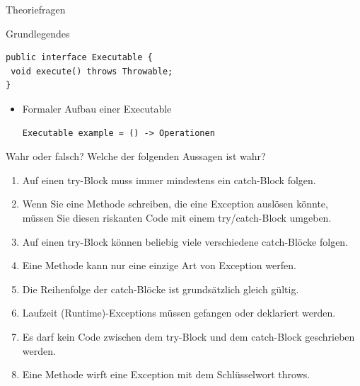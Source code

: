 \documentclass{../preamble}
\begin{document}
\begin{task}[credit = \stars{0}{3}]{Theoriefragen}
\begin{subtask*}{Grundlegendes}
\begin{solution}
\begin{enumerate}
\begin{itemize}
\begin{lstlisting}[style = Java]
public interface Executable {
 void execute() throws Throwable;
}
\end{lstlisting}
                                \begin{itemize}
                                    \item Formaler Aufbau einer Executable
                                          \begin{lstlisting}[style = Java]
Executable example = () -> Operationen
\end{lstlisting}
                                \end{itemize}
                      \end{itemize}
            \end{enumerate}
        \end{solution}
    \end{subtask*}

    \clearpage

    \begin{subtask*}{Wahr oder falsch?}
        Welche der folgenden Aussagen ist wahr?
        \begin{enumerate}[label = (\Alph*)]
            \item Auf einen \textcolor{keywordcolor}{try}-Block muss immer mindestens ein \textcolor{keywordcolor}{catch}-Block folgen.
            \item Wenn Sie eine Methode schreiben, die eine Exception auslösen könnte, müssen Sie diesen riskanten Code mit einem \textcolor{keywordcolor}{try}/\textcolor{keywordcolor}{catch}-Block umgeben.
            \item Auf einen \textcolor{keywordcolor}{try}-Block können beliebig viele verschiedene \textcolor{keywordcolor}{catch}-Blöcke folgen.
            \item Eine Methode kann nur eine einzige Art von Exception werfen.
            \item Die Reihenfolge der \textcolor{keywordcolor}{catch}-Blöcke ist grundsätzlich gleich gültig.
            \item Laufzeit (Runtime)-Exceptions müssen gefangen oder deklariert werden.
            \item Es darf kein Code zwischen dem \textcolor{keywordcolor}{try}-Block und dem \textcolor{keywordcolor}{catch}-Block  geschrieben werden.
            \item Eine Methode wirft eine Exception mit dem Schlüsselwort \textcolor{keywordcolor}{throws}.
        \end{enumerate}


\end{subtask*}
\end{task}
\end{document}

